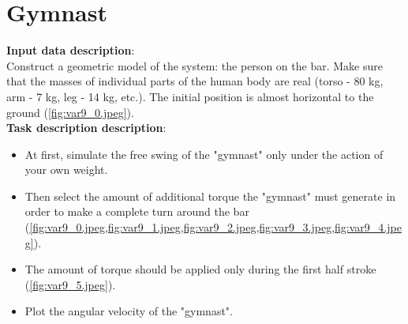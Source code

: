 \documentclass[12pt]{article}
\newcommand\ttask[3] 
 {
	\section*{#1}
	\textbf{Input data description}: \\ #2 \  \\
	\textbf{Task description description}: #3
	\newpage
 }
\begin{document}
\ttask{Gymnast}{
	Construct a geometric model of the system: the person on the bar. Make sure that the masses of individual parts of the human body are real (torso - 80 kg, arm - 7 kg, leg - 14 kg, etc.). The initial position is almost horizontal to the ground (\cref{fig:var9_0.jpeg}).
}{
	\begin{itemize}
		\item At first, simulate the free swing of the "gymnast" only under the action of your own weight.
		\item Then select the amount of additional torque the "gymnast" must generate in order to make a complete turn around the bar (\cref{fig:var9_0.jpeg,fig:var9_1.jpeg,fig:var9_2.jpeg,fig:var9_3.jpeg,fig:var9_4.jpeg}). 
		\item The amount of torque should be applied only during the first half stroke (\cref{fig:var9_5.jpeg}).
		\item Plot the angular velocity of the "gymnast".
	\end{itemize}

}
\end{document}
